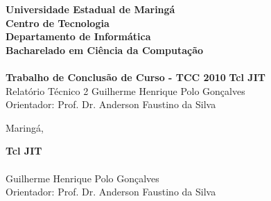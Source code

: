 \documentclass[12pt]{article}
\newcommand{\instituicao}{Universidade Estadual de Maringá \\
Centro de Tecnologia \\
Departamento de Informática \\
Bacharelado em Ciência da Computação \\
\hfill}
\newcommand{\tcc}{Trabalho de Conclusão de Curso - TCC 2010}
\newcommand{\titulo}{Tcl JIT}
\newcommand{\autor}{Guilherme Henrique Polo Gonçalves}
\newcommand{\orientador}{Prof. Dr. Anderson Faustino da Silva}
\newcommand{\local}{Maringá}
\newcommand*{\textbfsf}[1]{\textbf{\textsf{#1}}}
\begin{document}
\begin{titlepage}
  \begin{center}
    {\Large \textbfsf \instituicao}\\
    {\large \textbfsf \tcc}
    \vfill
    {\large \textbfsf \titulo\\\vfill Relatório Técnico 2}
    \vfill
    \autor\\
    Orientador: \orientador\\ %
  \end{center}

  \vfill

  \vfill
  \begin{center}
    \local, \@date
  \end{center}

\end{titlepage}

\clearpage
\thispagestyle{empty}
\begin{center}
  {\large \textbfsf \titulo}\\
  \quad\\
  \autor\\
  Orientador: \orientador\\ %
  \quad\\
\end{center}

\newpage

\setcounter{page}{1}

\end{document}
